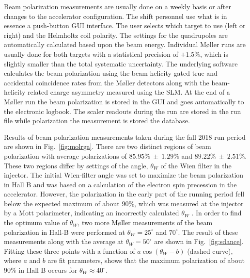 Beam polarization measurements are usually done on a weekly basis or after changes to the accelerator configuration.  The shift personnel
use what is in essence a push-button GUI interface. The user selects which target to use (left or right) and the
Helmholtz coil polarity. The settings for the quadrupoles are automatically calculated based upon the beam energy. Individual M{\o}ller runs
are usually done for both targets with a statistical precision of $\pm 1.5$\%, which is slightly smaller than the total systematic uncertainty. 
The underlying software calculates the beam polarization using the beam-helicity-gated true and accidental coincidence rates from 
the M{\o}ller detectors along with the beam-helicity related charge asymmetry measured using the SLM. 
At the end of a M{\o}ller run the beam polarization is stored in the GUI and goes automatically to the electronic logbook. The scaler 
readouts during the run are stored in the run file while polarization the measurement is stored the database. 


Results of beam polarization measurements taken during the fall 2018 run period are shown in Fig.~\ref{fig:molrga}.
There are two distinct regions of beam polarization with average polarizations of $85.95\% ~\pm ~1.29\%$ and $89.22\%~\pm~2.51\%$. 
These two regions differ by settings of the angle, $\theta_W$ of the Wien filter in the injector. The initial Wien-filter angle was 
set to maximize the beam polarization in Hall B and was based on a calculation of the electron spin precession in the accelerator. 
However, the polarization in the early part of the running period fell below the expected maximum of about 90\%, which was measured 
at the injector by a Mott polarimeter, indicating an incorrectly calculated $\theta_W$ . In order to find the optimum value of $\theta_W$, 
two more M{\o}ller measurements of the beam polarization in Hall-B were performed at $\theta_W=25^\circ$ and $70^\circ$.  
The result of these measurements along with the average at $\theta_W=50^\circ$ are shown in Fig.~\ref{fig:sdance}. Fitting these three 
points with a function of $a\cos\left(\theta_W-b\right)$ (dashed curve), where $a$ and $b$ are fit parameters,  shows that the maximum
polarization of about 90\% in Hall B occurs for $\theta_W\approx 40^\circ$.
 
